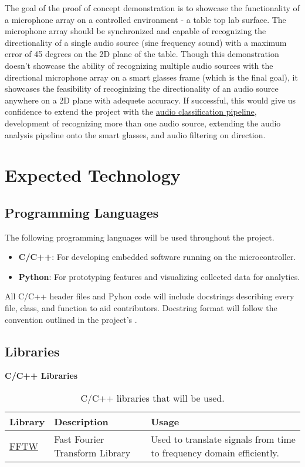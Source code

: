 \documentclass{article}
\begin{document}
The goal of the proof of concept demonstration is to showcase the functionality of a microphone array on a controlled environment - a table top lab surface.
The microphone array should be synchronized and capable of recognizing the directionality of a single audio source (sine frequency sound) with a maximum error of 45 degrees on the 2D plane of the table.
Though this demonstration doesn't showcase the ability of recognizing multiple audio sources with the directional microphone array on a smart glasses frame (which is the final goal), it showcases the feasibility of recoginizing the directionality of an audio source anywhere on a 2D plane with adequete accuracy.
If successful, this would give us confidence to extend the project with the \hyperlink{audio_classification_pipeline}{audio classification pipeline}, development of recognizing more than one audio source, extending the audio analysis pipeline onto the smart glasses, and audio filtering on direction. 

\section{Expected Technology}

\subsection{Programming Languages}
The following programming languages will be used throughout the project.
\begin{itemize}
  \item \textbf{C/C++}: For developing embedded software running on the microcontroller.
  \item \textbf{Python}: For prototyping features and visualizing collected data for analytics.
\end{itemize}

All C/C++ header files and Pyhon code will include docstrings describing every file, class, and function to aid contributors.
Docstring format will follow the convention outlined in the project's .

\subsection{Libraries}

\textbf{C/C++ Libraries}
\begin{table}[h!]
\centering
\begin{tabularx}{\textwidth}{|l|X|X|}
\hline
\textbf{Library} & \textbf{Description} & \textbf{Usage} \\ \hline
\href{https://www.fftw.org/}{FFTW} & Fast Fourier Transform Library & Used to translate signals from time to frequency domain efficiently. \\ \hline
\end{tabularx}
\caption{C/C++ libraries that will be used.}
\end{table}
\end{document}
